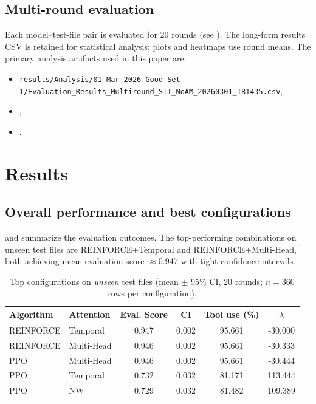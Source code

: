 \documentclass[11pt]{article}
\begin{document}
\subsection{Multi-round evaluation}
Each model--test-file pair is evaluated for 20 rounds (see ). The long-form results CSV is retained for statistical analysis; plots and heatmaps use round means. The primary analysis artifacts used in this paper are:
\begin{itemize}
  \item \texttt{results/Analysis/01-Mar-2026 Good Set-1/Evaluation\_Results\_Multiround\_SIT\_NoAM\_20260301\_181435.csv},
  \item \texttt{},
  \item \texttt{}.
\end{itemize}

\section{Results}
\subsection{Overall performance and best configurations}
 and  summarize the evaluation outcomes. The top-performing combinations on unseen test files are \textsc{REINFORCE}+Temporal and \textsc{REINFORCE}+Multi-Head, both achieving mean evaluation score $\approx 0.947$ with tight confidence intervals.

\begin{table}[t]
\centering
\caption{Top configurations on \emph{unseen} test files (mean $\pm$ 95\% CI, 20 rounds; $n=360$ rows per configuration).}
\label{tab:top}
\begin{tabular}{ll S[table-format=1.3] S[table-format=1.3] S[table-format=2.3] S[table-format=3.3]}
\toprule
\textbf{Algorithm} & \textbf{Attention} & {\textbf{Eval. Score}} & {\textbf{CI}} & {\textbf{Tool use (\%)}} & {\textbf{$\lambda$}} \\
\midrule
REINFORCE & Temporal   & 0.947 & 0.002 & 95.661 & -30.000 \\
REINFORCE & Multi-Head & 0.946 & 0.002 & 95.661 & -30.333 \\
PPO       & Multi-Head & 0.946 & 0.002 & 95.661 & -30.444 \\
PPO       & Temporal   & 0.732 & 0.032 & 81.171 & 113.444 \\
PPO       & NW         & 0.729 & 0.032 & 81.482 & 109.389 \\
\bottomrule
\end{tabular}
\end{table}
\end{document}
